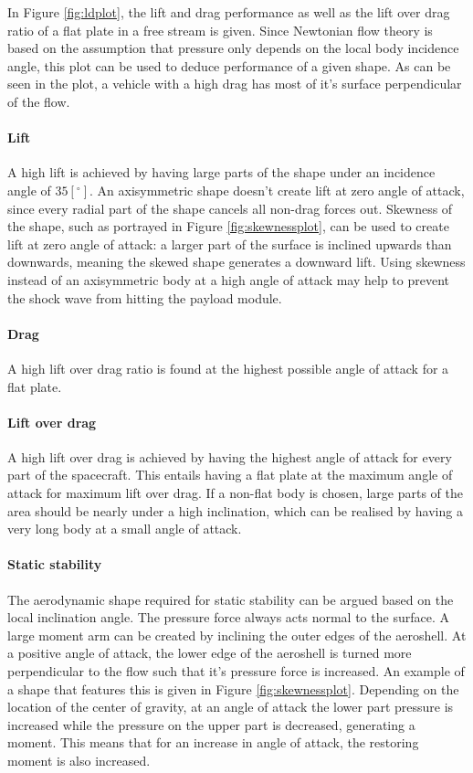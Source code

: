 In Figure \ref{fig:ldplot}, the lift and drag performance as well as the lift over drag ratio of a flat plate in a free stream is given. Since Newtonian flow theory is based on the assumption that pressure only depends on the local body incidence angle, this plot can be used to deduce performance of a given shape. As can be seen in the plot, a vehicle with a high drag has most of it's surface perpendicular of the flow.

\paragraph{Lift}
A high lift is achieved by having large parts of the shape under an incidence angle of $35 [^\circ]$. An axisymmetric shape doesn't create lift at zero angle of attack, since every radial part of the shape cancels all non-drag forces out. Skewness of the shape, such as portrayed in Figure \ref{fig:skewnessplot}, can be used to create lift at zero angle of attack: a larger part of the surface is inclined upwards than downwards, meaning the skewed shape generates a downward lift. Using skewness instead of an axisymmetric body at a high angle of attack may help to prevent the shock wave from hitting the payload module.

\paragraph{Drag}
A high lift over drag ratio is found at the highest possible angle of attack for a flat plate.

\paragraph{Lift over drag}
A high lift over drag is achieved by having the highest angle of attack for every part of the spacecraft. This entails having a flat plate at the maximum angle of attack for maximum lift over drag. If a non-flat body is chosen, large parts of the area should be nearly under a high inclination, which can be realised by having a very long body at a small angle of attack.

\paragraph{Static stability}
The aerodynamic shape required for static stability can be argued based on the local inclination angle. The pressure force always acts normal to the surface. A large moment arm can be created by inclining the outer edges of the aeroshell. At a positive angle of attack, the lower edge of the aeroshell is turned more perpendicular to the flow such that it's pressure force is increased. An example of a shape that features this is given in Figure \ref{fig:skewnessplot}. Depending on the location of the center of gravity, at an angle of attack the lower part pressure is increased while the pressure on the upper part is decreased, generating a moment. This means that for an increase in angle of attack, the restoring moment is also increased.


